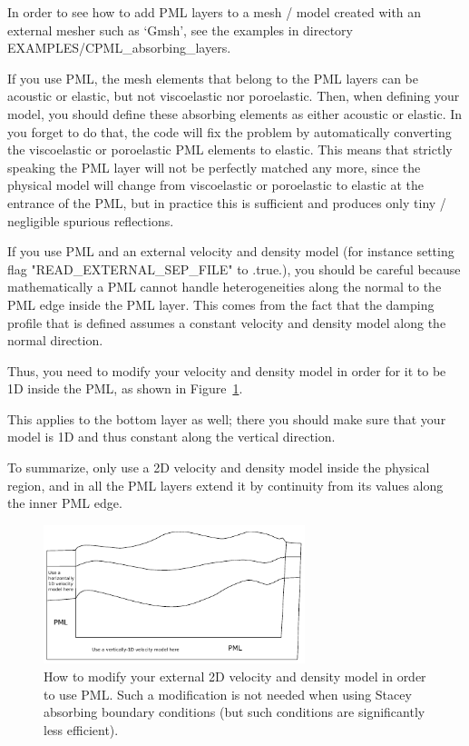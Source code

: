 \documentclass[oneside,english,onecolumn,letterpaper]{book}
\begin{document}
In order to see how to add PML layers to a mesh / model created with an external mesher such as `Gmsh', see the examples in directory
EXAMPLES/CPML\_absorbing\_layers.

If you use PML, the mesh elements that belong to the PML layers can be acoustic or elastic, but not viscoelastic nor poroelastic.
Then, when defining your model, you should define these absorbing elements as either acoustic or elastic.
In you forget to do that, the code will fix the problem by automatically converting the viscoelastic or poroelastic PML
elements to elastic. This means that strictly speaking the PML layer will not be perfectly matched any more, since the physical
model will change from viscoelastic or poroelastic to elastic at the entrance of the PML, but in practice this is sufficient and
produces only tiny / negligible spurious reflections.

If you use PML and an external velocity and density model (for instance setting flag "READ\_EXTERNAL\_SEP\_FILE" to .true.),
you should be careful because mathematically a PML cannot handle heterogeneities along the
normal to the PML edge inside the PML layer. This comes from the fact that the damping profile
that is defined assumes a constant velocity and density model along the normal
direction.

Thus, you need to modify your velocity and density model in order for it to be 1D inside
the PML, as shown in Figure~\ref{fig:modify_external_velocity_model_to_use_PML}.

This applies to the bottom layer as well; there you should make sure
that your model is 1D and thus constant along the vertical direction.

To summarize, only use a 2D velocity and density model inside the physical region, and in
all the PML layers extend it by continuity from its values along the
inner PML edge.

\begin{figure}[htbp]
\noindent \begin{centering}
\includegraphics[width=3in]{figures/how_to_use_PML_when_READ_EXTERNAL_SEP_FILE_is_true}
\par\end{centering}
\caption{How to modify your external 2D velocity and density model in order to use PML.
Such a modification is not needed when using Stacey absorbing boundary conditions (but such conditions
are significantly less efficient).}
\label{fig:modify_external_velocity_model_to_use_PML}
\end{figure}
\end{document}
